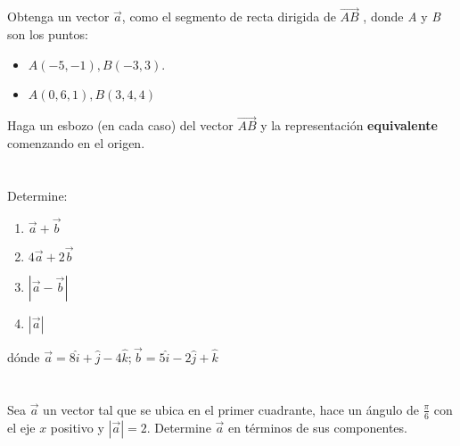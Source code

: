 \documentclass[12pt]{article}
\begin{document}
\section{}
Obtenga un vector $\vec{a}$, como el segmento de recta dirigida de $\vec{AB}$ , donde \textit{A} y \textit{B} son los puntos:

\begin{itemize}
  
\item $A(-5,-1) , B(-3,3)$.
  
\item $A(0,6,1), B(3,4,4)$
  
\end{itemize}

Haga un esbozo (en cada caso) del vector $\vec{AB}$ y la representación \textbf{equivalente} comenzando en el origen.

\section{}

Determine:

\begin{enumerate}
  
\item $\vec{a} + \vec{b}$
  
\item $4 \vec{a} + 2\vec{b}$

\item $|\vec{a} - \vec{b}|$

\item $|\vec{a}|$

\end{enumerate}

dónde $\vec{a}=8\hat{i} + \hat{j} - 4\hat{k}; \vec{b}= 5\hat{i} - 2\hat{j} +\hat{k}$

\section{}

Sea $\vec{a}$ un vector tal que se ubica en el primer cuadrante, hace un ángulo de $\frac{\pi}{6}$ con el eje $x$ positivo  y $|\vec{a}|=2$. Determine $\vec{a}$ en términos de sus componentes.
\end{document}
